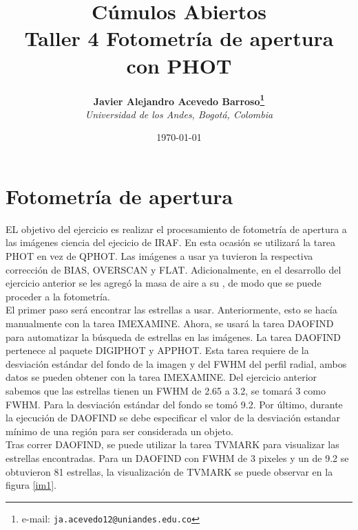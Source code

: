 \documentclass[12pt]{article}
\begin{document}
\title{Cúmulos Abiertos \\ Taller 4 Fotometría de apertura con PHOT}

\author{
\textbf{Javier Alejandro Acevedo Barroso\thanks{e-mail: \texttt{ja.acevedo12@uniandes.edu.co}}}\\
\textit{Universidad de los Andes, Bogotá, Colombia}\\
 }%

\date{\today}
\maketitle %


\normalsize
\newpage



\section{Fotometría de apertura}
EL objetivo del ejercicio es realizar el procesamiento de fotometría de apertura a las imágenes ciencia del ejecicio  de IRAF. En esta ocasión se utilizará la tarea PHOT en vez de QPHOT.
Las imágenes a usar ya tuvieron la respectiva corrección de BIAS, OVERSCAN y FLAT. Adicionalmente, en el desarrollo del ejercicio anterior se les agregó la masa de aire a su , de modo que se puede proceder a la fotometría.\\

El primer paso será encontrar las estrellas a usar. Anteriormente, esto se hacía manualmente con la tarea IMEXAMINE. 
Ahora, se usará la tarea DAOFIND para automatizar la búsqueda de estrellas en las imágenes. 
La tarea DAOFIND pertenece al paquete DIGIPHOT y APPHOT. 
Esta tarea requiere de la desviación estándar del {fondo} de la imagen y del FWHM del perfil radial, ambos datos se pueden obtener con la tarea IMEXAMINE.
Del ejercicio anterior sabemos que las estrellas tienen un FWHM de 2.65 a 3.2, se tomará 3 como FWHM. Para la desviación estándar del fondo se tomó 9.2.
Por último, durante la ejecución de DAOFIND se debe especificar el valor de la desviación estandar mínimo de una región para ser considerada un objeto.    	\\

Tras correr DAOFIND, se puede utilizar la tarea TVMARK para visualizar las estrellas encontradas.
Para un DAOFIND con FWHM de 3 pixeles y un  de 9.2 se obtuvieron 81 estrellas, la visualización de TVMARK se puede observar en la figura \ref{im1}.\\
\end{document}
